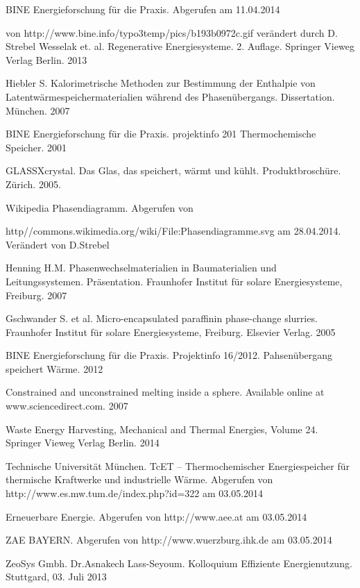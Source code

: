\documentclass[11pt,a4paper]{scrartcl}
\begin{document}
\begin{thebibliography}{99}
	BINE Energieforschung für die Praxis. Abgerufen am 11.04.2014
	
	von http://www.bine.info/typo3temp/pics/b193b0972c.gif verändert durch D. Strebel
	Wesselak et. al. Regenerative Energiesysteme. 2. Auflage.
	Springer Vieweg Verlag Berlin. 2013
	
	 Hiebler S. Kalorimetrische Methoden zur Bestimmung der
	Enthalpie von Latentwärmespeichermaterialien während des Phasenübergangs. Dissertation.
	München. 2007
	
	 BINE Energieforschung für die Praxis. projektinfo 2\/01
	Thermochemische Speicher. 2001
	
	 GLASSX\circledR crystal. Das Glas, das speichert, wärmt und
	kühlt. Produktbroschüre. Zürich. 2005.
	 
	 Wikipedia Phasendiagramm. 
	Abgerufen von
	
	http//commons.wikimedia.org/wiki/File:Phasendiagramme.svg am 28.04.2014.
	Verändert von D.Strebel
	
	 Henning H.M. Phasenwechselmaterialien in Baumaterialien und
	Leitungssystemen. Präsentation. Fraunhofer Institut für solare Energiesysteme,
	Freiburg. 2007
	
	 Gschwander S. et al. Micro-encapsulated paraffinin
	phase-change slurries. Fraunhofer Institut für solare Energiesysteme,
	Freiburg. Elsevier Verlag. 2005

	 BINE Energieforschung für die Praxis. Projektinfo 16/2012.
	Pahsenübergang speichert Wärme. 2012
		
	 Constrained and unconstrained melting inside a sphere. Available online at www.sciencedirect.com. 2007
	
	 Waste Energy Harvesting, Mechanical and Thermal Energies, Volume 24.
		Springer Vieweg Verlag Berlin. 2014
		
	 Technische Universität München. TcET – Thermochemischer Energiespeicher für thermische Kraftwerke und industrielle Wärme.
	Abgerufen von http://www.es.mw.tum.de/index.php?id=322 am 03.05.2014		
		
	
	 Erneuerbare Energie. 
	Abgerufen von http://www.aee.at am 03.05.2014
	
	
     ZAE BAYERN. Abgerufen von http://www.wuerzburg.ihk.de am 03.05.2014	%
    
     ZeoSys Gmbh. Dr.Asnakech Lass-Seyoum. Kolloquium Effiziente Energienutzung. Stuttgard, 03. Juli 2013
	
\end{thebibliography}
\end{document}
